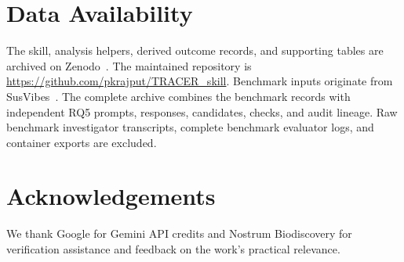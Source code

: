 \section*{Data Availability}
The skill, analysis helpers, derived outcome records, and supporting tables are archived on Zenodo~\cite{tracerartifact}. The maintained repository is \url{https://github.com/pkrajput/TRACER_skill}. Benchmark inputs originate from SusVibes~\cite{susvibesartifact}. The complete archive combines the benchmark records with independent RQ5 prompts, responses, candidates, checks, and audit lineage. Raw benchmark investigator transcripts, complete benchmark evaluator logs, and container exports are excluded.

\section*{Acknowledgements}
We thank Google for Gemini API credits and Nostrum Biodiscovery for verification assistance and feedback on the work's practical relevance.
